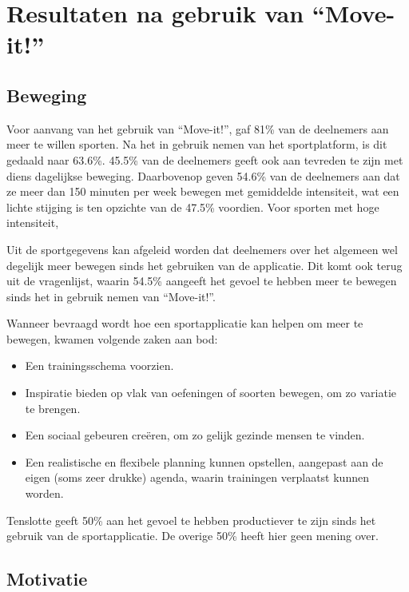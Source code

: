 \section{Resultaten na gebruik van ``Move-it!''}

\subsection{Beweging}


Voor aanvang van het gebruik van ``Move-it!'', gaf 81\% van de deelnemers aan meer te willen sporten. Na het in gebruik nemen van het sportplatform, is dit gedaald naar 63.6\%.
45.5\% van de deelnemers geeft ook aan tevreden te zijn met diens dagelijkse beweging. Daarbovenop geven 54.6\% van de deelnemers aan dat ze meer dan 150 minuten per week bewegen met gemiddelde intensiteit, wat een lichte stijging is ten opzichte van de 47.5\% voordien. Voor sporten met hoge intensiteit,

Uit de sportgegevens kan afgeleid worden dat deelnemers over het algemeen wel degelijk meer bewegen sinds het gebruiken van de applicatie. Dit komt ook terug uit de vragenlijst, waarin 54.5\% aangeeft het gevoel te hebben meer te bewegen sinds het in gebruik nemen van ``Move-it!''.

Wanneer bevraagd wordt hoe een sportapplicatie kan helpen om meer te bewegen, kwamen volgende zaken aan bod:

\begin{itemize}
    \item Een trainingsschema voorzien.
    \item Inspiratie bieden op vlak van oefeningen of soorten bewegen, om zo variatie te brengen.
    \item Een sociaal gebeuren creëren, om zo gelijk gezinde mensen te vinden.
    \item Een realistische en flexibele planning kunnen opstellen, aangepast aan de eigen (soms zeer drukke) agenda, waarin trainingen verplaatst kunnen worden.
\end{itemize}

Tenslotte geeft 50\% aan het gevoel te hebben productiever te zijn sinds het gebruik van de sportapplicatie. De overige 50\% heeft hier geen mening over.

\subsection{Motivatie}

